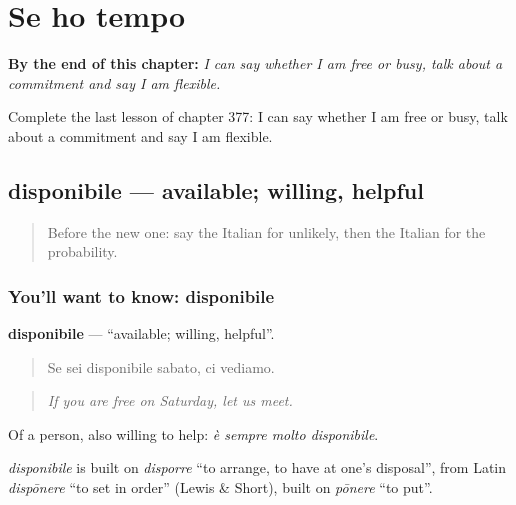 
\chapter{Se ho tempo}
\label{ch:it-se-ho-tempo}

\begin{chapteropening}
\textbf{By the end of this chapter:} \emph{I can say whether I am free or busy, talk about a commitment and say I am flexible.}

Complete the last lesson of chapter 377: I can say whether I am free or busy, talk about a commitment and say I am flexible.
\end{chapteropening}

\section[disponibile]{disponibile — available; willing, helpful}

\label{lesson:IT-C377-disponibile}



\begin{quote}
Before the new one: say the Italian for unlikely, then the Italian for the probability.
\end{quote}

\subsection*{You'll want to know: disponibile}
\textbf{disponibile} — \textquotedblleft{}available; willing, helpful\textquotedblright{}.

\begin{quote}
Se sei disponibile sabato, ci vediamo.
\end{quote}

\begin{quote}
\emph{If you are free on Saturday, let us meet.}
\end{quote}

Of a person, also willing to help: \emph{è sempre molto disponibile}.

\begin{cousinweb}
\emph{disponibile} is built on \emph{disporre} \textquotedblleft{}to arrange, to have at one's disposal\textquotedblright{}, from Latin \emph{dispōnere} \textquotedblleft{}to set in order\textquotedblright{} (Lewis \& Short), built on \emph{pōnere} \textquotedblleft{}to put\textquotedblright{}.
\end{cousinweb}

